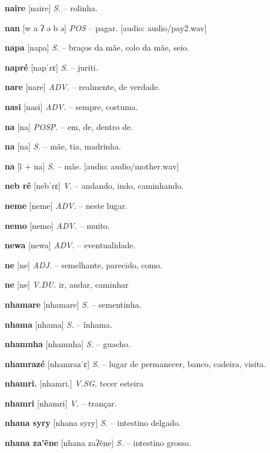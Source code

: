 \textbf{naire} [naire] \textit{S.} -- rolinha.

\textbf{nan} [w a ʔ ə b ə] \textit{POS} -- pagar. [audio: audio/pay2.wav]{\faHeadphones}

\textbf{napa} [napa] \textit{S.} -- braços da mãe, colo da mãe, seio.

\textbf{napré} [napˈrɛ] \textit{S.} -- juriti.

\textbf{nare} [nare] \textit{ADV.} -- realmente, de verdade.

\textbf{nasi} [nasi] \textit{ADV.} -- sempre, costuma.

\textbf{na} [na] \textit{POSP.} -- em, de, dentro de.

\textbf{na} [na] \textit{S.} -- mãe, tia, madrinha.

\textbf{na} [ĩ + na] \textit{S.} -- mãe. [audio: audio/mother.wav]{\faHeadphones}

\textbf{neb ré} [nebˈrɛ] \textit{V.} -- andando, indo, caminhando.

\textbf{neme} [neme] \textit{ADV.} -- neste lugar.

\textbf{nemo} [nemo] \textit{ADV.} -- muito.

\textbf{newa} [newa] \textit{ADV.} -- eventualidade.

\textbf{ne} [ne] \textit{ADJ.} -- semelhante, parecido, como.

\textbf{ne} [ne] \textit{V.DU.} ir, andar, caminhar

\textbf{nhamare} [nhamare] \textit{S.} -- sementinha.

\textbf{nhama} [nhama] \textit{S.} -- ĩnhama.

\textbf{nhamnha} [nhamnha] \textit{S.} -- guacho.

\textbf{nhamrazé} [nhamrazˈɛ] \textit{S.} -- lugar de permanecer, banco, cadeira, visita.

\textbf{nhamri.} [nhamri.] \textit{V.SG.} tecer esteira

\textbf{nhamri} [nhamri] \textit{V.} -- trançar.

\textbf{nhana syry} [nhana syry] \textit{S.} -- intestino delgado.

\textbf{nhana za'ẽne} [nhana zaʔẽne] \textit{S.} -- intestino grosso.

